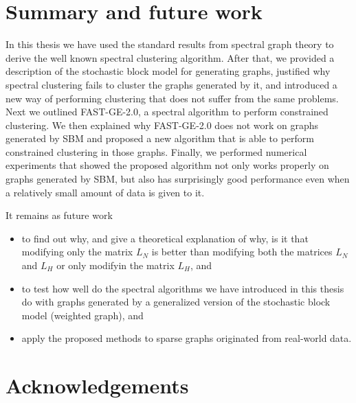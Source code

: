 \chapter{Summary and future work}
In this thesis we have used the standard results from spectral graph theory to derive the well known spectral clustering algorithm. 
After that, we provided a description of the stochastic block model for generating graphs, justified why spectral clustering fails to cluster the graphs generated by it, and introduced a new way of performing clustering that does not suffer from the same problems.
Next we outlined FAST-GE-2.0, a spectral algorithm to perform constrained clustering.
We then explained why FAST-GE-2.0 does not work on graphs generated by SBM and proposed a new algorithm that is able to perform constrained clustering in those graphs.
Finally, we performed numerical experiments that showed the proposed algorithm not only works properly on graphs generated by SBM, but also has surprisingly good performance even when a relatively small amount of data is given to it.

It remains as future work 
\begin{itemize}
   \item to find out why, and give a theoretical explanation of why, is it that modifying only the matrix $L_N$ is better than modifying both the matrices $L_N$ and $L_H$ or only modifyin the matrix $L_H$, and
   \item to test how well do the spectral algorithms we have introduced in this thesis do with graphs generated by a generalized version of the stochastic block model (weighted graph), and
   \item apply the proposed methods to sparse graphs originated from real-world data.
\end{itemize}


\chapter*{Acknowledgements}

\newpage

\renewcommand{\bibname}{References}


{}




